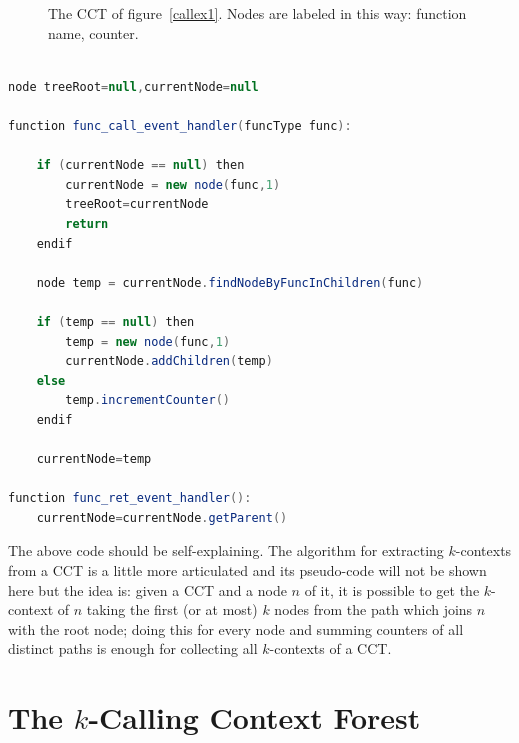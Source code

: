 \documentclass[a4paper,11pt]{report}
\begin{document}
\begin{figure}[t]

\begin{center}
\end{center}

\caption{The CCT of figure~\ref{callex1}. Nodes are labeled in this way: function name, counter.}
\label{cct1}

\end{figure}
\begin{lstlisting}[language=java, morekeywords={function,then,endif},frame=leftline,framesep=10pt]

node treeRoot=null,currentNode=null

function func_call_event_handler(funcType func):

	if (currentNode == null) then 	
		currentNode = new node(func,1) 
		treeRoot=currentNode
		return
	endif

	node temp = currentNode.findNodeByFuncInChildren(func)

	if (temp == null) then
		temp = new node(func,1)
		currentNode.addChildren(temp)
	else
		temp.incrementCounter()
	endif

	currentNode=temp

function func_ret_event_handler():
	currentNode=currentNode.getParent()

\end{lstlisting}

The above code should be self-explaining.
The algorithm for extracting $k$-contexts from a CCT is a little more articulated 
and its pseudo-code will not be shown here but the idea is: given a CCT and a node $n$ of it, it is possible to get the $k$-context of $n$ taking the first (or at most) $k$ nodes from the path which joins $n$ with the root node; doing this for every node and summing counters of all distinct paths is enough for collecting all $k$-contexts of a CCT.

\section{The $k$-Calling Context Forest}
\end{document}
